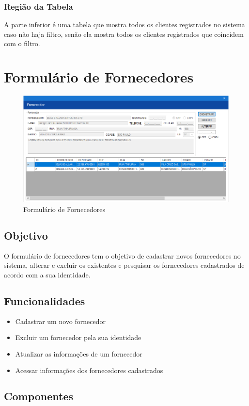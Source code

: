 \documentclass[
	article,			%
	12pt,				%
	oneside,			%
	a4paper,			%
	english,			%
	brazil,				%
	sumario=tradicional
	]{abntex2}
\begin{document}
			\subsubsection{Região da Tabela}
			A parte inferior é uma tabela que mostra todos os clientes registrados no sistema caso não haja filtro, senão ela mostra todos os clientes registrados que coincidem com o filtro.
	\newpage
	\section{Formulário de Fornecedores}
		\begin{figure}[!htb]
			\centering
			\includegraphics[scale=0.6]{./Figuras/FrmFornecedor.png}
			\caption{Formulário de Fornecedores}
		\end{figure}
		\subsection{Objetivo}
		O formulário de fornecedores tem o objetivo de cadastrar novos fornecedores no sistema, alterar e excluir os existentes e pesquisar os fornecedores cadastrados de acordo com a sua identidade.
		\subsection{Funcionalidades}
			\begin{itemize}
			\item Cadastrar um novo fornecedor
			\item Excluir um fornecedor pela sua identidade
			\item Atualizar as informações de um fornecedor
			\item Acessar informações dos fornecedores cadastrados
			\end{itemize}
		\subsection{Componentes}
\end{document}

